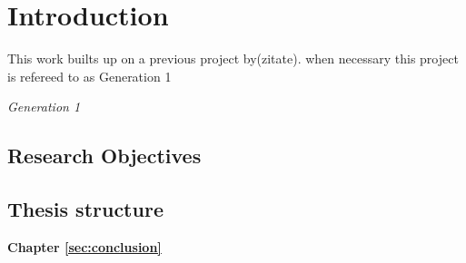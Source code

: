 %
\chapter{Introduction}
\label{sec:intro}
This work builts up on a previous project by(zitate). when necessary this project is refereed to as Generation 1

\textit{Generation 1} \citep{Widmer2018}

\section{Research Objectives}

\section{Thesis structure}

\textbf{Chapter \ref{sec:conclusion}} \\[0.2em]
\blindtext
